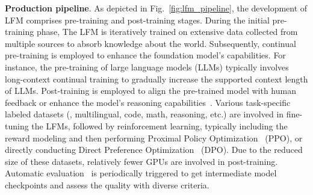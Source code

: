 \noindent \textbf{Production pipeline}.
As depicted in Fig.~\ref{fig:lfm_pipeline}, the development of LFM comprises pre-training and post-training stages.
During the initial pre-training phase, The LFM is iteratively trained on extensive data 
collected from multiple sources to absorb knowledge about the world. 
Subsequently, continual pre-training is employed to enhance the foundation model's capabilities. 
For instance, the pre-training of large language models (LLMs) typically involves long-context continual training to gradually increase the supported context length of LLMs. 
Post-training is employed to align the pre-trained model with human feedback or enhance the model's reasoning capabilities~\cite{openai-o1, deepseek-r1}.
Various task-specific labeled datasets (\eg, multilingual, code, math, reasoning, etc.) are involved in fine-tuning the LFMs, followed by reinforcement learning, typically including the reward modeling and then performing Proximal Policy Optimization~\cite{ppo} (PPO), or directly conducting Direct Preference Optimization~\cite{dpo} (DPO). 
Due to the reduced size of these datasets, relatively fewer GPUs are involved in post-training.
Automatic evaluation~\cite{characterization, check-n-run} is periodically triggered to get intermediate model checkpoints and assess the quality with diverse criteria.

